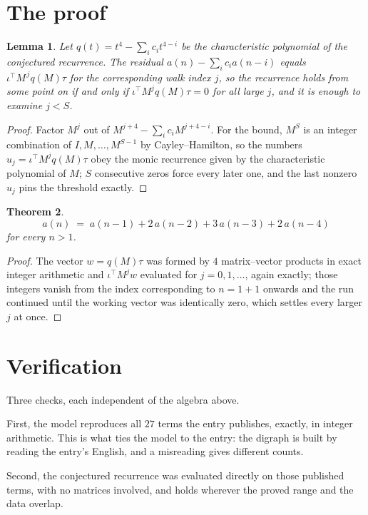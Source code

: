 \documentclass[11pt,a4paper]{article}
\theoremstyle{plain}
\newtheorem{theorem}{Theorem}
\newtheorem{lemma}[theorem]{Lemma}
\theoremstyle{definition}
\begin{document}
\section{The proof}

\begin{lemma}\label{lem:crit}
Let $q(t)=t^{4}-\sum_i c_it^{4-i}$ be the characteristic polynomial of the
conjectured recurrence. The residual $a(n)-\sum_ic_ia(n-i)$ equals
$\iota^{\!\top}M^{\,j}q(M)\tau$ for the corresponding walk index $j$, so the recurrence
holds from some point on if and only if $\iota^{\!\top}M^{j}q(M)\tau=0$ for all large $j$,
and it is enough to examine $j<S$.
\end{lemma}

\begin{proof}
Factor $M^{j}$ out of $M^{j+4}-\sum_ic_iM^{j+4-i}$. For the bound, $M^{S}$
is an integer combination of $I,M,\dots,M^{S-1}$ by Cayley--Hamilton, so the numbers
$u_j=\iota^{\!\top}M^{j}q(M)\tau$ obey the monic recurrence given by the characteristic
polynomial of $M$; $S$ consecutive zeros force every later one, and the last nonzero $u_j$
pins the threshold exactly.
\end{proof}

\begin{theorem}
\[
a(n)\;=\;a(n-1) + 2\,a(n-2) + 3\,a(n-3) + 2\,a(n-4)
\]
for every $n>1$.
\end{theorem}

\begin{proof}
The vector $w=q(M)\tau$ was formed by $4$ matrix--vector products in exact integer
arithmetic and $\iota^{\!\top}M^{j}w$ evaluated for $j=0,1,\dots$, again exactly; those
integers vanish from the index corresponding to $n=1+1$ onwards and the run continued
until the working vector was identically zero, which settles every larger $j$ at once.
\end{proof}

\section{Verification}

Three checks, each independent of the algebra above.

First, the model reproduces all $27$ terms the entry publishes, exactly, in integer
arithmetic. This is what ties the model to the entry: the digraph is built by reading the
entry's English, and a misreading gives different counts.

Second, the conjectured recurrence was evaluated directly on those published terms, with no
matrices involved, and holds wherever the proved range and the data overlap.
\end{document}
